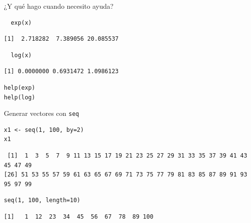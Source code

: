 \documentclass[xcolor={usenames,svgnames,dvipsnames}]{beamer}
\begin{document}
\begin{frame}[fragile,label=sec-2-1-3]{¿Y qué hago cuando necesito ayuda?}
 \lstset{language=R,label= ,caption= ,numbers=none}
\begin{lstlisting}
  exp(x)
\end{lstlisting}

\begin{verbatim}
[1]  2.718282  7.389056 20.085537
\end{verbatim}

\lstset{language=R,label= ,caption= ,numbers=none}
\begin{lstlisting}
  log(x)
\end{lstlisting}

\begin{verbatim}
[1] 0.0000000 0.6931472 1.0986123
\end{verbatim}

\lstset{language=R,label= ,caption= ,numbers=none}
\begin{lstlisting}
help(exp)
help(log)
\end{lstlisting}
\end{frame}

\begin{frame}[fragile,label=sec-2-1-4]{Generar vectores con \texttt{seq}}
 \lstset{language=R,label= ,caption= ,numbers=none}
\begin{lstlisting}
x1 <- seq(1, 100, by=2)
x1
\end{lstlisting}

\begin{verbatim}
 [1]  1  3  5  7  9 11 13 15 17 19 21 23 25 27 29 31 33 35 37 39 41 43 45 47 49
[26] 51 53 55 57 59 61 63 65 67 69 71 73 75 77 79 81 83 85 87 89 91 93 95 97 99
\end{verbatim}

\lstset{language=R,label= ,caption= ,numbers=none}
\begin{lstlisting}
seq(1, 100, length=10)
\end{lstlisting}

\begin{verbatim}
[1]   1  12  23  34  45  56  67  78  89 100
\end{verbatim}
\end{frame}
\end{document}

